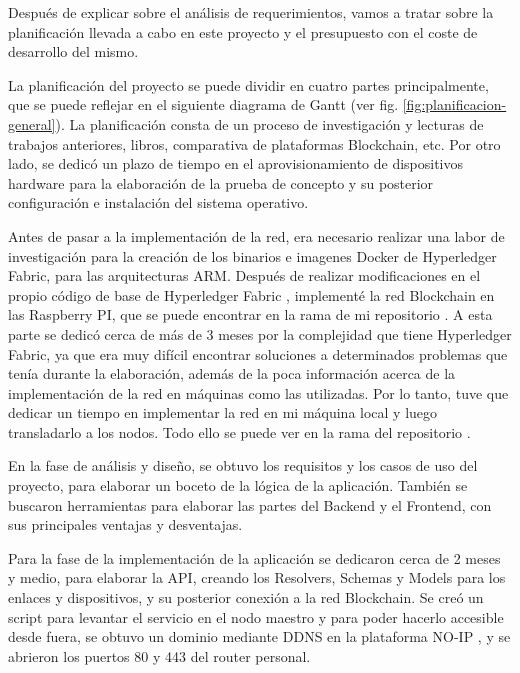 Después de explicar sobre el análisis de requerimientos, vamos a tratar sobre la planificación llevada a cabo en este 
proyecto y el presupuesto con el coste de desarrollo del mismo.

\vspace{5mm}

\noindent La planificación del proyecto se puede dividir en cuatro partes principalmente, que se puede reflejar en el 
siguiente diagrama de Gantt (ver fig. \ref{fig:planificacion-general}). La planificación consta de un proceso de 
investigación y lecturas de trabajos anteriores, libros, comparativa de plataformas Blockchain, etc. Por otro lado, se 
dedicó un plazo de tiempo en el aprovisionamiento de dispositivos hardware para la elaboración de la prueba de concepto y 
su posterior configuración e instalación del sistema operativo.

\vspace{5mm}

\noindent Antes de pasar a la implementación de la red, era necesario realizar una labor de investigación para la creación 
de los binarios e imagenes Docker de Hyperledger Fabric, para las arquitecturas ARM. Después de realizar modificaciones en 
el propio código de base de Hyperledger Fabric \cite{fabric-baseimage}, implementé la red Blockchain en las Raspberry PI, 
que se puede encontrar en la rama  de mi repositorio \cite{repo}. A esta parte se dedicó cerca de más 
de 3 meses por la complejidad que tiene Hyperledger Fabric, ya que era muy difícil encontrar soluciones a determinados 
problemas que tenía durante la elaboración, además de la poca información acerca de la implementación de la red en máquinas 
como las utilizadas. Por lo tanto, tuve que dedicar un tiempo en implementar la red en mi máquina local y luego 
transladarlo a los nodos. Todo ello se puede ver en la rama  del repositorio \cite{repo}. 

\vspace{5mm}

\noindent En la fase de análisis y diseño, se obtuvo los requisitos y los casos de uso del proyecto, para elaborar un 
boceto de la lógica de la aplicación. También se buscaron herramientas para elaborar las partes del Backend y el Frontend, 
con sus principales ventajas y desventajas.

\vspace{5mm}

\noindent Para la fase de la implementación de la aplicación se dedicaron cerca de 2 meses y medio, para elaborar la API, 
creando los Resolvers, Schemas y Models para los enlaces y dispositivos, y su posterior conexión a la red Blockchain. Se 
creó un script para levantar el servicio en el nodo maestro y para poder hacerlo accesible desde fuera, se obtuvo un 
dominio mediante DDNS en la plataforma NO-IP \cite{no-ip}, y se abrieron los puertos 80 y 443 del router personal.

